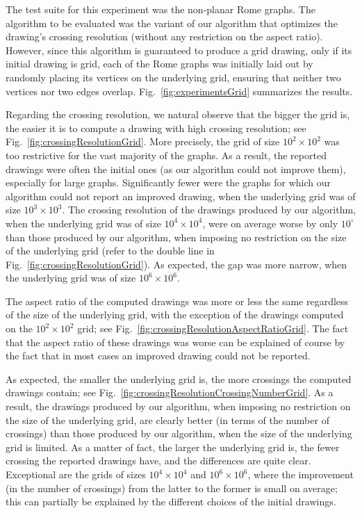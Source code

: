 \documentclass{comjnl}
\begin{document}
The test suite for this experiment was the non-planar Rome graphs. The algorithm to be evaluated was the variant of our algorithm that optimizes the drawing's crossing resolution (without any restriction on the aspect ratio). However, since this algorithm is guaranteed to produce a grid drawing, only if its initial drawing is grid, each of the Rome graphs was initially laid out by randomly placing its vertices on the underlying grid, ensuring that neither two vertices nor two edges overlap. Fig.~\ref{fig:experimentsGrid} summarizes the results.

Regarding the crossing resolution, we natural observe that the bigger the grid is, the easier it is to compute a drawing with high crossing resolution; see Fig.~\ref{fig:crossingResolutionGrid}. More precisely, the grid of size $10^2 \times 10^2$ was too restrictive for the vast majority of the graphs. As a result, the reported drawings were often the initial ones (as our algorithm could not improve them), especially for large graphs. Significantly fewer were the graphs for which our algorithm could not report an improved drawing, when the underlying grid was of size $10^3 \times 10^3$. The crossing resolution of the drawings produced by our algorithm, when the underlying grid was of size $10^4 \times 10^4$, were on average worse by only $10^\circ$ than those produced by our algorithm, when imposing no restriction on the size of the underlying grid (refer to the double line in Fig.~\ref{fig:crossingResolutionGrid}). As expected, the gap was more narrow, when the underlying grid was of size $10^6 \times 10^6$.

The aspect ratio of the computed drawings was more or less the same regardless of the size of the underlying grid, with the exception of the drawings computed on the $10^2 \times 10^2$ grid; see Fig.~\ref{fig:crossingResolutionAspectRatioGrid}. The fact that the aspect ratio of these drawings was worse can be explained of course by the fact that in most cases an improved drawing could not be reported.

As expected, the smaller the underlying grid is, the more crossings the computed drawings contain; see Fig.~\ref{fig:crossingResolutionCrossingNumberGrid}. As a result, the drawings produced by our algorithm, when imposing no restriction on the size of the underlying grid, are clearly better (in terms of the number of crossings) than those produced by our algorithm, when the size of the underlying grid is limited. As a matter of fact, the larger the underlying grid is, the fewer crossing the reported drawings have, and the differences are quite clear. Exceptional are the grids of sizes $10^4 \times 10^4$ and $10^6 \times 10^6$, where the improvement (in the number of crossings) from the latter to the former is small on average; this can partially be explained by the different choices of the initial drawings.
\end{document}
